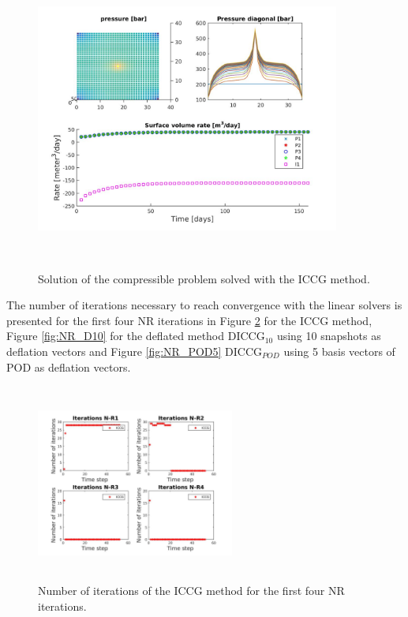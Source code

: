 \documentclass[12pt]{article}
\begin{document}
\begin{figure}[!h]
\centering
\begin{minipage}{.7\textwidth}
 \centering
\includegraphics[width=10cm,height=10cm,keepaspectratio]
{solutionIC.jpg}
\caption{Solution of the compressible problem solved with the ICCG method.}
\label{fig:compsol}
\end{minipage}
\end{figure}

The number of iterations necessary to reach convergence with the linear solvers is presented for the first four NR iterations in Figure \ref{fig:NR_IC} for the ICCG method, Figure \ref{fig:NR_D10} for the deflated method DICCG$_{10}$ using 10 snapshots as deflation vectors and Figure \ref{fig:NR_POD5} DICCG$_{POD}$ using 5 basis vectors of POD as deflation vectors. 
\begin{figure}[!h]
\centering
\begin{minipage}{.4\textwidth}
 \centering
\includegraphics[width=6.5cm,height=6.5cm,keepaspectratio]
{iterations_4NR_IC.jpg}
\caption{Number of iterations of the ICCG method for the first four NR iterations.}
\label{fig:NR_IC}
\end{minipage}
\end{figure}
\end{document}
